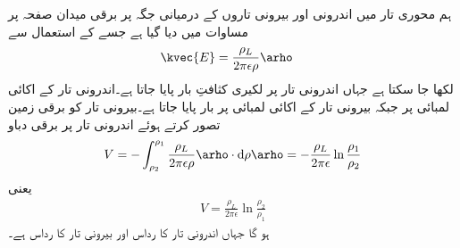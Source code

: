 ہم محوری تار میں اندرونی اور بیرونی تاروں کے درمیانی جگہ پر برقی میدان صفحہ  پر  مساوات  میں دیا گیا ہے جسے  کے استعمال سے
\begin{align}\label{مساوات_توانائی_ہم_محوری_تار_ذوبرق_میدان}
\kvec{E}&=\frac{\rho_L}{2\pi \epsilon \rho} \arho
\end{align}
لکھا جا سکتا ہے جہاں اندرونی تار پر  لکیری کثافتِ بار پایا جاتا ہے۔اندرونی تار  کے اکائی لمبائی پر  جبکہ بیرونی تار کے اکائی لمبائی پر  بار پایا جاتا ہے۔بیرونی تار کو برقی زمین تصور کرتے ہوئے اندرونی تار پر برقی دباو
\begin{align*}
V=-\int_{\rho_2}^{\rho_1} \frac{\rho_L}{2\pi \epsilon \rho} \arho \cdot  \dif \rho \arho=-\frac{\rho_L}{2\pi\epsilon} \ln \frac{\rho_1}{\rho_2}
\end{align*}
یعنی
\begin{align}\label{مساوات_توانائی_ہم_محوری_تار_برقی_دباو}
V=\frac{\rho_L}{2\pi\epsilon} \ln \frac{\rho_2}{\rho_1}
\end{align}
ہو گا جہاں اندرونی تار کا رداس  اور بیرونی تار کا رداس  ہے۔

